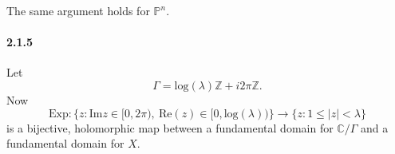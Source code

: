 \documentclass[10pt,letter]{article}
\begin{document}
The same argument holds for $\mathbb{P}^n$. 

\paragraph*{2.1.5} Let \[ \Gamma = \text{log}(\lambda) \mathbb{Z} + i 2 \pi \mathbb{Z}.\] Now \[ \text{Exp}: \lbrace z: \text{Im} z \in [0,2\pi), \ \text{Re}(z) \in [0,\text{log}(\lambda)) \rbrace  \rightarrow \lbrace z: 1 \leq \vert z \vert < \lambda \rbrace\] is a bijective, holomorphic map between a fundamental domain for $\mathbb{C}/\Gamma$ and a fundamental domain for $X$. 
\end{document}
